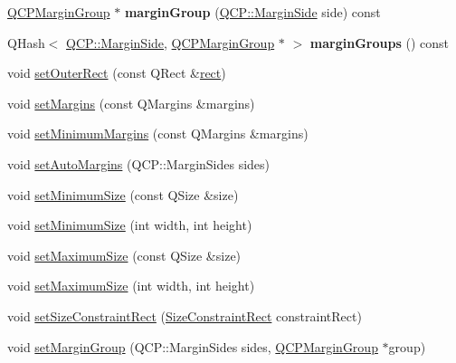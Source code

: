 \begin{DoxyCompactItemize}
\item 
\hyperlink{classQCPMarginGroup}{Q\+C\+P\+Margin\+Group} $\ast$ {\bfseries margin\+Group} (\hyperlink{namespaceQCP_a7e487e3e2ccb62ab7771065bab7cae54}{Q\+C\+P\+::\+Margin\+Side} side) const \hypertarget{classQCPLayoutElement_a22cb1bb62c452fd802e43ca2524660db}{}\label{classQCPLayoutElement_a22cb1bb62c452fd802e43ca2524660db}

\item 
Q\+Hash$<$ \hyperlink{namespaceQCP_a7e487e3e2ccb62ab7771065bab7cae54}{Q\+C\+P\+::\+Margin\+Side}, \hyperlink{classQCPMarginGroup}{Q\+C\+P\+Margin\+Group} $\ast$ $>$ {\bfseries margin\+Groups} () const \hypertarget{classQCPLayoutElement_ac43921c997570389c14a1671bc3ea499}{}\label{classQCPLayoutElement_ac43921c997570389c14a1671bc3ea499}

\item 
void \hyperlink{classQCPLayoutElement_a38975ea13e36de8e53391ce41d94bc0f}{set\+Outer\+Rect} (const Q\+Rect \&\hyperlink{classQCPLayoutElement_affdfea003469aac3d0fac5f4e06171bc}{rect})
\item 
void \hyperlink{classQCPLayoutElement_a8f450b1f3f992ad576fce2c63d8b79cf}{set\+Margins} (const Q\+Margins \&margins)
\item 
void \hyperlink{classQCPLayoutElement_a0a8a17abc16b7923159fcc7608f94673}{set\+Minimum\+Margins} (const Q\+Margins \&margins)
\item 
void \hyperlink{classQCPLayoutElement_accfda49994e3e6d51ed14504abf9d27d}{set\+Auto\+Margins} (Q\+C\+P\+::\+Margin\+Sides sides)
\item 
void \hyperlink{classQCPLayoutElement_a5dd29a3c8bc88440c97c06b67be7886b}{set\+Minimum\+Size} (const Q\+Size \&size)
\item 
void \hyperlink{classQCPLayoutElement_a8e0447614a0bf92de9a7304588c6b96e}{set\+Minimum\+Size} (int width, int height)
\item 
void \hyperlink{classQCPLayoutElement_a74eb5280a737ab44833d506db65efd95}{set\+Maximum\+Size} (const Q\+Size \&size)
\item 
void \hyperlink{classQCPLayoutElement_a03e0e9c48f230217c529b0819f832d84}{set\+Maximum\+Size} (int width, int height)
\item 
void \hyperlink{classQCPLayoutElement_a361666cdcc6fbfd37344cc44be746b0f}{set\+Size\+Constraint\+Rect} (\hyperlink{classQCPLayoutElement_a0afb3e5773529e4bd20e448f81be4d2a}{Size\+Constraint\+Rect} constraint\+Rect)
\item 
void \hyperlink{classQCPLayoutElement_a516e56f76b6bc100e8e71d329866847d}{set\+Margin\+Group} (Q\+C\+P\+::\+Margin\+Sides sides, \hyperlink{classQCPMarginGroup}{Q\+C\+P\+Margin\+Group} $\ast$group)

\end{DoxyCompactItemize}
